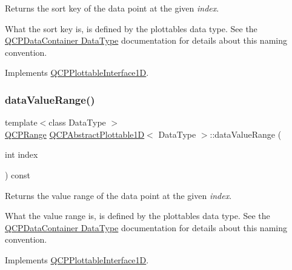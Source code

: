 Returns the sort key of the data point at the given {\itshape index}.

What the sort key is, is defined by the plottable\textquotesingle{}s data type. See the \hyperlink{class_q_c_p_data_container_qcpdatacontainer-datatype}{Q\+C\+P\+Data\+Container Data\+Type} documentation for details about this naming convention. 

Implements \hyperlink{class_q_c_p_plottable_interface1_d_afdc92f9f01e7e35f2e96b2ea9dc14ae7}{Q\+C\+P\+Plottable\+Interface1D}.

\mbox{\label{class_q_c_p_abstract_plottable1_d_ac6201b01aee550ef0a240183781d1f9a}} 
\subsubsection{\texorpdfstring{data\+Value\+Range()}{dataValueRange()}}
{\footnotesize\ttfamily template$<$class Data\+Type $>$ \\
\hyperlink{class_q_c_p_range}{Q\+C\+P\+Range} \hyperlink{class_q_c_p_abstract_plottable1_d}{Q\+C\+P\+Abstract\+Plottable1D}$<$ Data\+Type $>$\+::data\+Value\+Range (\begin{DoxyParamCaption}\item[{int}]{index }\end{DoxyParamCaption}) const\hspace{0.3cm}{\ttfamily [virtual]}}





Returns the value range of the data point at the given {\itshape index}.

What the value range is, is defined by the plottable\textquotesingle{}s data type. See the \hyperlink{class_q_c_p_data_container_qcpdatacontainer-datatype}{Q\+C\+P\+Data\+Container Data\+Type} documentation for details about this naming convention. 

Implements \hyperlink{class_q_c_p_plottable_interface1_d_a9ca7fcf14d885a200879768679b19be9}{Q\+C\+P\+Plottable\+Interface1D}.

\mbox{\label{class_q_c_p_abstract_plottable1_d_a7adc6c3cccebb5341f11e0c2b7d54206}} 
